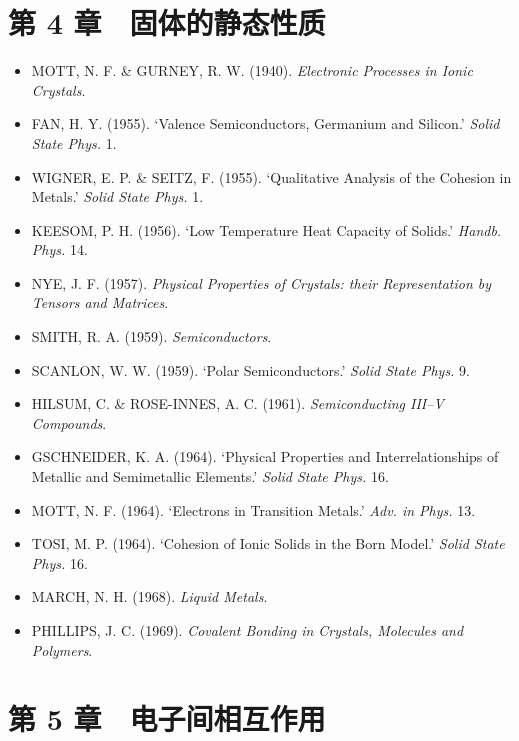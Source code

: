 \section*{第 4 章　固体的静态性质}

\begin{itemize}[leftmargin=2em, itemsep=0.2em]
\item MOTT, N. F. \& GURNEY, R. W. (1940). \emph{Electronic Processes in Ionic Crystals}.
\item FAN, H. Y. (1955). `Valence Semiconductors, Germanium and Silicon.' \emph{Solid State Phys.} 1.
\item WIGNER, E. P. \& SEITZ, F. (1955). `Qualitative Analysis of the Cohesion in Metals.' \emph{Solid State Phys.} 1.
\item KEESOM, P. H. (1956). `Low Temperature Heat Capacity of Solids.' \emph{Handb. Phys.} 14.
\item NYE, J. F. (1957). \emph{Physical Properties of Crystals: their Representation by Tensors and Matrices}.
\item SMITH, R. A. (1959). \emph{Semiconductors}.
\item SCANLON, W. W. (1959). `Polar Semiconductors.' \emph{Solid State Phys.} 9.
\item HILSUM, C. \& ROSE-INNES, A. C. (1961). \emph{Semiconducting III--V Compounds}.
\item GSCHNEIDER, K. A. (1964). `Physical Properties and Interrelationships of Metallic and Semimetallic Elements.' \emph{Solid State Phys.} 16.
\item MOTT, N. F. (1964). `Electrons in Transition Metals.' \emph{Adv. in Phys.} 13.
\item TOSI, M. P. (1964). `Cohesion of Ionic Solids in the Born Model.' \emph{Solid State Phys.} 16.
\item MARCH, N. H. (1968). \emph{Liquid Metals}.
\item PHILLIPS, J. C. (1969). \emph{Covalent Bonding in Crystals, Molecules and Polymers}.
\end{itemize}

\section*{第 5 章　电子间相互作用}


